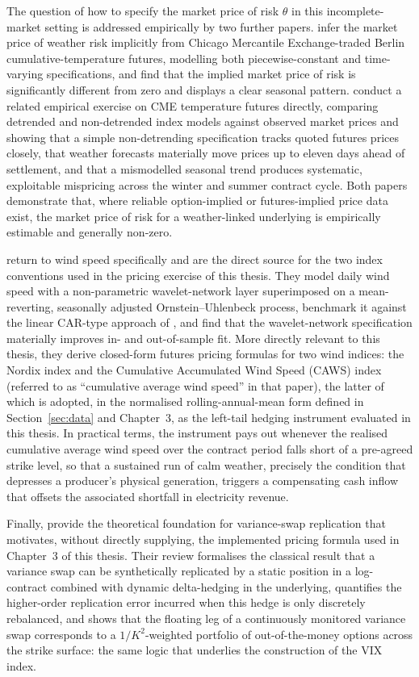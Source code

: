 ﻿\documentclass[11pt, a4paper, twoside]{article}
\begin{document}
The question of how to specify the market price of risk $\theta$ in this incomplete-market setting is addressed empirically by two further papers. \citet{HardleLopezCabrera2009} infer the market price of weather risk implicitly from Chicago Mercantile Exchange-traded Berlin cumulative-temperature futures, modelling both piecewise-constant and time-varying specifications, and find that the implied market price of risk is significantly different from zero and displays a clear seasonal pattern. \citet{DorfleitnerWimmer2010} conduct a related empirical exercise on CME temperature futures directly, comparing detrended and non-detrended index models against observed market prices and showing that a simple non-detrending specification tracks quoted futures prices closely, that weather forecasts materially move prices up to eleven days ahead of settlement, and that a mismodelled seasonal trend produces systematic, exploitable mispricing across the winter and summer contract cycle. Both papers demonstrate that, where reliable option-implied or futures-implied price data exist, the market price of risk for a weather-linked underlying is empirically estimable and generally non-zero.

\citet{AlexandridisZapranis2013} return to wind speed specifically and are the direct source for the two index conventions used in the pricing exercise of this thesis. They model daily wind speed with a non-parametric wavelet-network layer superimposed on a mean-reverting, seasonally adjusted Ornstein--Uhlenbeck process, benchmark it against the linear CAR-type approach of \citet{BenthSaltyteBenth2009}, and find that the wavelet-network specification materially improves in- and out-of-sample fit. More directly relevant to this thesis, they derive closed-form futures pricing formulas for two wind indices: the Nordix index and the Cumulative Accumulated Wind Speed (CAWS) index (referred to as ``cumulative average wind speed'' in that paper), the latter of which is adopted, in the normalised rolling-annual-mean form defined in Section~\ref{sec:data} and Chapter~3, as the left-tail hedging instrument evaluated in this thesis. In practical terms, the instrument pays out whenever the realised cumulative average wind speed over the contract period falls short of a pre-agreed strike level, so that a sustained run of calm weather, precisely the condition that depresses a producer's physical generation, triggers a compensating cash inflow that offsets the associated shortfall in electricity revenue.

Finally, \citet{CarrLee2009} provide the theoretical foundation for variance-swap replication that motivates, without directly supplying, the implemented pricing formula used in Chapter~3 of this thesis. Their review formalises the classical result that a variance swap can be synthetically replicated by a static position in a log-contract combined with dynamic delta-hedging in the underlying, quantifies the higher-order replication error incurred when this hedge is only discretely rebalanced, and shows that the floating leg of a continuously monitored variance swap corresponds to a $1/K^2$-weighted portfolio of out-of-the-money options across the strike surface: the same logic that underlies the construction of the VIX index.
\end{document}
